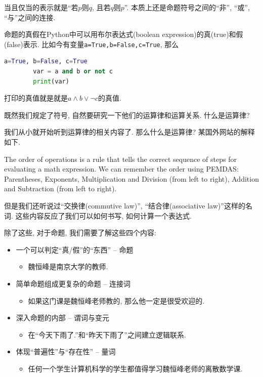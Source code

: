 当且仅当的表示就是``若$p$则$q$, 且若$q$则$p$''. 本质上还是命题符号之间的``非'', ``或'', ``与''之间的连接. 

\begin{example}
	命题的真假在Python中可以用布尔表达式(boolean expression)的真(true)和假(false)表示. 比如今有变量\texttt{a=True,b=False,c=True}, 那么
	\begin{lstlisting}[language=Python]
		a=True, b=False, c=True
		var = a and b or not c
		print(var)
	\end{lstlisting}
	打印的真值就是就是$a\land b\lor \lnot c$的真值. 
\end{example}

既然我们规定了符号, 自然要研究一下他们的运算律和运算关系. 什么是运算律? 

\begin{example}
	我们从小就开始听到运算律的相关内容了. 那么什么是运算律? 某国外网站的解释如下. 
	
		
The order of operations is a rule that tells the correct sequence of steps for evaluating a math expression. We can remember the order using PEMDAS: Parentheses, Exponents, Multiplication and Division (from left to right), Addition and Subtraction (from left to right).

	但是我们还听说过``交换律(commutive law)'', ``结合律(associative law)''这样的名词. 这些内容反应了我们可以如何书写, 如何计算一个表达式. 

	
\end{example}


\begin{idea}
	除了这些, 对于命题, 我们需要了解这些四个内容: 
\begin{itemize}
	\item 一个可以判定“真/假”的“东西” – 命题
	\begin{itemize}
		\item 魏恒峰是南京大学的教师.
	\end{itemize}
	\item 简单命题组成更复杂的命题 – 连接词
	\begin{itemize}
		\item 如果这门课是魏恒峰老师教的, 那么他一定是很受欢迎的. 
	\end{itemize}
	\item 深入命题的内部 – 谓词与变元
	\begin{itemize}
		\item 在“今天下雨了.”和“昨天下雨了”之间建立逻辑联系.
	\end{itemize}
	\item 体现“普遍性”与“存在性” – 量词
	\begin{itemize}
		\item 任何一个学生计算机科学的学生都值得学习魏恒峰老师的离散数学课. 
	\end{itemize}
	
\end{itemize}
\end{idea}

